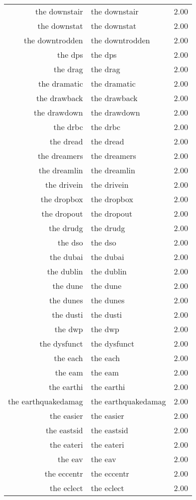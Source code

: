 \begin{table}[ht]
\begin{tabular}{rlr}
  the downstair & the downstair & 2.00 \\ 
  the downstat & the downstat & 2.00 \\ 
  the downtrodden & the downtrodden & 2.00 \\ 
  the dps & the dps & 2.00 \\ 
  the drag & the drag & 2.00 \\ 
  the dramatic & the dramatic & 2.00 \\ 
  the drawback & the drawback & 2.00 \\ 
  the drawdown & the drawdown & 2.00 \\ 
  the drbc & the drbc & 2.00 \\ 
  the dread & the dread & 2.00 \\ 
  the dreamers & the dreamers & 2.00 \\ 
  the dreamlin & the dreamlin & 2.00 \\ 
  the drivein & the drivein & 2.00 \\ 
  the dropbox & the dropbox & 2.00 \\ 
  the dropout & the dropout & 2.00 \\ 
  the drudg & the drudg & 2.00 \\ 
  the dso & the dso & 2.00 \\ 
  the dubai & the dubai & 2.00 \\ 
  the dublin & the dublin & 2.00 \\ 
  the dune & the dune & 2.00 \\ 
  the dunes & the dunes & 2.00 \\ 
  the dusti & the dusti & 2.00 \\ 
  the dwp & the dwp & 2.00 \\ 
  the dysfunct & the dysfunct & 2.00 \\ 
  the each & the each & 2.00 \\ 
  the eam & the eam & 2.00 \\ 
  the earthi & the earthi & 2.00 \\ 
  the earthquakedamag & the earthquakedamag & 2.00 \\ 
  the easier & the easier & 2.00 \\ 
  the eastsid & the eastsid & 2.00 \\ 
  the eateri & the eateri & 2.00 \\ 
  the eav & the eav & 2.00 \\ 
  the eccentr & the eccentr & 2.00 \\ 
  the eclect & the eclect & 2.00 \\ 

\end{tabular}
\end{table}
